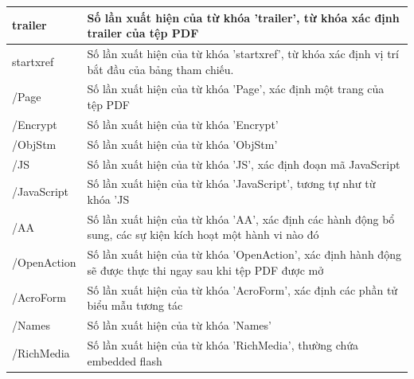 \documentclass[./../main.tex]{subfiles}
\begin{document}
\begin{longtable}[c]{|p{}|p{}|}
	trailer                                   & Số lần xuất hiện của từ khóa 'trailer', từ khóa xác định trailer của tệp PDF                                                \\ \hline
	startxref                                 & Số lần xuất hiện của từ khóa 'startxref', từ khóa xác định vị trí bắt đầu của bảng tham chiếu.                              \\ \hline
	/Page                                     & Số lần xuất hiện của từ khóa 'Page', xác định một trang của tệp PDF                                                         \\ \hline
	/Encrypt                                  & Số lần xuất hiện của từ khóa 'Encrypt'                                                                                      \\ \hline
	/ObjStm                                   & Số lần xuất hiện của từ khóa 'ObjStm'                                                                                       \\ \hline
	/JS                                       & Số lần xuất hiện của từ khóa 'JS', xác định đoạn mã JavaScript                                                              \\ \hline
	/JavaScript                               & Số lần xuất hiện của từ khóa 'JavaScript', tương tự như từ khóa 'JS                                                         \\ \hline
	/AA                                       & Số lần xuất hiện của từ khóa 'AA', xác định các hành động bổ sung, các sự kiện kích hoạt một hành vi nào đó                 \\ \hline
	/OpenAction                               & Số lần xuất hiện của từ khóa 'OpenAction', xác định hành động sẽ được thực thi ngay sau khi tệp PDF được mở                 \\ \hline
	/AcroForm                                 & Số lần xuất hiện của từ khóa 'AcroForm', xác định các phần tử biểu mẫu tương tác                                            \\ \hline
	/Names                                    & Số lần xuất hiện của từ khóa 'Names'                                                                                        \\ \hline
	/RichMedia                                & Số lần xuất hiện của từ khóa 'RichMedia', thường chứa embedded flash                                                        \\ \hline

\end{longtable}
\end{document}
